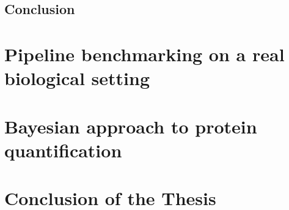 \documentclass[11pt, a4paper]{report}
\begin{document}
\section{Conclusion}


\chapter{Pipeline benchmarking on a real biological setting}
\label{chap:benchmark}

\chapter{Bayesian approach to protein quantification}
\label{chap:model}


\chapter{Conclusion of the Thesis}
\label{chap:conclusion}



\footnotesize{}
\end{document}

